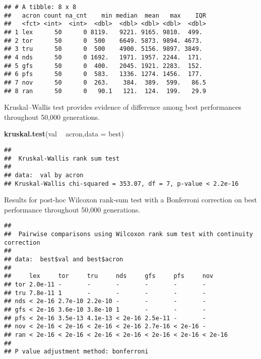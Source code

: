 \documentclass[]{book}
\newenvironment{Shaded}{\begin{snugshade}}{\end{snugshade}}
\newcommand{\DataTypeTok}[1]{\textcolor[rgb]{0.13,0.29,0.53}{#1}}
\newcommand{\KeywordTok}[1]{\textcolor[rgb]{0.13,0.29,0.53}{\textbf{#1}}}
\newcommand{\NormalTok}[1]{#1}
\newcommand{\OperatorTok}[1]{\textcolor[rgb]{0.81,0.36,0.00}{\textbf{#1}}}
\newcommand{\OtherTok}[1]{\textcolor[rgb]{0.56,0.35,0.01}{#1}}
\newcommand{\StringTok}[1]{\textcolor[rgb]{0.31,0.60,0.02}{#1}}
\begin{document}
\begin{verbatim}
## # A tibble: 8 x 8
##   acron count na_cnt    min median  mean   max    IQR
##   <fct> <int>  <int>  <dbl>  <dbl> <dbl> <dbl>  <dbl>
## 1 lex      50      0 8119.   9221. 9165. 9810.  499. 
## 2 tor      50      0  500    6649. 5873. 9894. 4673. 
## 3 tru      50      0  500    4900. 5156. 9897. 3849. 
## 4 nds      50      0 1692.   1971. 1957. 2244.  171. 
## 5 gfs      50      0  400.   2045. 1921. 2283.  152. 
## 6 pfs      50      0  583.   1336. 1274. 1456.  177. 
## 7 nov      50      0  263.    384.  389.  599.   86.5
## 8 ran      50      0   90.1   121.  124.  199.   29.9
\end{verbatim}

Kruskal--Wallis test provides evidence of difference among best performances throughout 50,000 generations.

\begin{Shaded}
\begin{Highlighting}[]
\KeywordTok{kruskal.test}\NormalTok{(val }\OperatorTok{~}\StringTok{ }\NormalTok{acron,}\DataTypeTok{data =}\NormalTok{ best)}
\end{Highlighting}
\end{Shaded}

\begin{verbatim}
## 
##  Kruskal-Wallis rank sum test
## 
## data:  val by acron
## Kruskal-Wallis chi-squared = 353.07, df = 7, p-value < 2.2e-16
\end{verbatim}

Results for post-hoc Wilcoxon rank-sum test with a Bonferroni correction on best performance throughout 50,000 generations.

\begin{Shaded}
\end{Shaded}

\begin{verbatim}
## 
##  Pairwise comparisons using Wilcoxon rank sum test with continuity correction 
## 
## data:  best$val and best$acron 
## 
##     lex     tor     tru     nds     gfs     pfs     nov    
## tor 2.0e-11 -       -       -       -       -       -      
## tru 7.8e-11 1       -       -       -       -       -      
## nds < 2e-16 2.7e-10 2.2e-10 -       -       -       -      
## gfs < 2e-16 3.6e-10 3.8e-10 1       -       -       -      
## pfs < 2e-16 3.5e-13 4.1e-13 < 2e-16 2.5e-11 -       -      
## nov < 2e-16 < 2e-16 < 2e-16 < 2e-16 2.7e-16 < 2e-16 -      
## ran < 2e-16 < 2e-16 < 2e-16 < 2e-16 < 2e-16 < 2e-16 < 2e-16
## 
## P value adjustment method: bonferroni
\end{verbatim}
\end{document}

